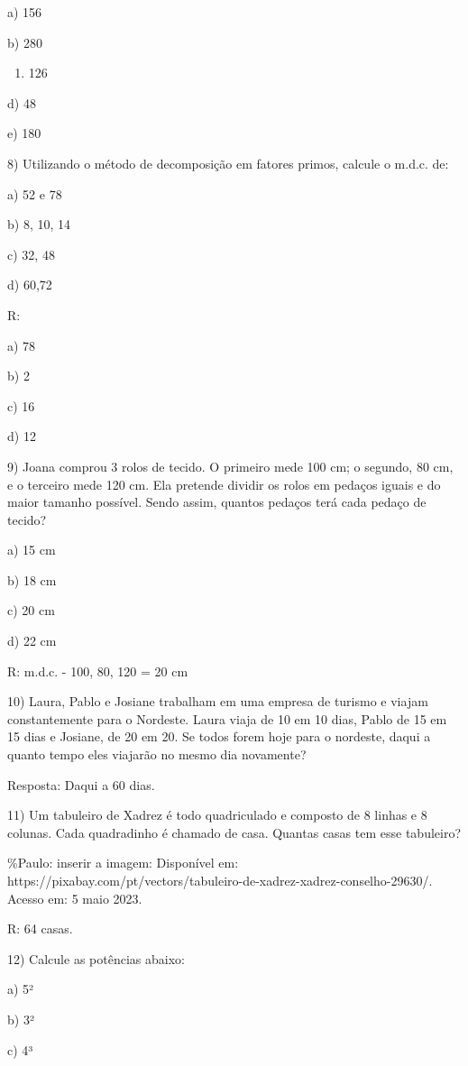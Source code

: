 a) 156

b) 280

\begin{enumerate}
\def\labelenumi{\alph{enumi})}
\setcounter{enumi}{2}
\tightlist
\item
  126
\end{enumerate}

d) 48

e) 180

8) Utilizando o método de decomposição em fatores primos, calcule o
m.d.c. de:

a) 52 e 78

b) 8, 10, 14

c) 32, 48

d) 60,72

R:

a) 78

b) 2

c) 16

d) 12

9) Joana comprou 3 rolos de tecido. O primeiro mede 100 cm; o segundo,
80 cm, e o terceiro mede 120 cm. Ela pretende dividir os rolos em
pedaços iguais e do maior tamanho possível. Sendo assim, quantos pedaços
terá cada pedaço de tecido?

a) 15 cm

b) 18 cm

c) 20 cm

d) 22 cm

R: m.d.c. - 100, 80, 120 = 20 cm

10) Laura, Pablo e Josiane trabalham em uma empresa de turismo e viajam
constantemente para o Nordeste. Laura viaja de 10 em 10 dias, Pablo de
15 em 15 dias e Josiane, de 20 em 20. Se todos forem hoje para o
nordeste, daqui a quanto tempo eles viajarão no mesmo dia novamente?

Resposta: Daqui a 60 dias.

11) Um tabuleiro de Xadrez é todo quadriculado e composto de 8 linhas e
8 colunas. Cada quadradinho é chamado de casa. Quantas casas tem esse
tabuleiro?

\%Paulo: inserir a imagem: Disponível em:
https://pixabay.com/pt/vectors/tabuleiro-de-xadrez-xadrez-conselho-29630/.
Acesso em: 5 maio 2023.

R: 64 casas.

12) Calcule as potências abaixo:

a) 5²

b) 3²

c) 4³

